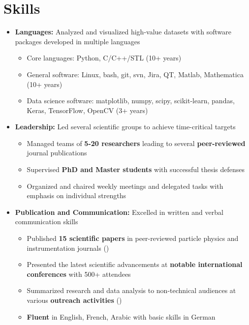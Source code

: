 \documentclass{myfancycv}
\begin{document}
\section{Skills}
\begin{itemize}

\item {\textbf{Languages:} Analyzed and visualized high-value datasets with software packages developed in multiple languages
{\begin{itemize}\setlength\itemindent{-2.2em}
\item Core languages: Python, C/C++/STL (10+ years)
\item General software: Linux, bash, git, svn, Jira, QT, Matlab, Mathematica (10+ years)
\item Data science software: matplotlib, numpy, scipy, scikit-learn, pandas, Keras, TensorFlow, OpenCV (3+ years)
\end{itemize}
}
}

\vspace{6pt}

\item {\textbf{Leadership:} Led several scientific groups to achieve time-critical targets
{\begin{itemize}\setlength\itemindent{-2.2em}
    \item Managed teams of {\bf5-20 researchers} leading to several {\bf peer-reviewed} journal publications
    \item Supervised {\bf PhD and Master students} with successful thesis defenses
    \item Organized and chaired weekly meetings and delegated tasks with emphasis on individual strengths


\end{itemize}}%
}

\vspace{6pt}

\item{ \textbf{Publication and Communication:} Excelled in written and verbal communication skills
{\begin{itemize}\setlength\itemindent{-2.2em}
\item Published {\bf15 scientific papers} in peer-reviewed particle physics and instrumentation journals (\href{https://orcid.org/0000-0002-9169-0793}{})
\item Presented the latest scientific advancements at {\bf notable international conferences} with 500+ attendees
\item Summarized research and data analysis to non-technical audiences at various {\bf outreach activities} (\href{http://atlas.cern/updates/physics-briefing/probing-dark-matter-higgs-boson}{})
\item {\bf Fluent} in English, French, Arabic with basic skills in German


\end{itemize}}}
\end{itemize}
\end{document}
